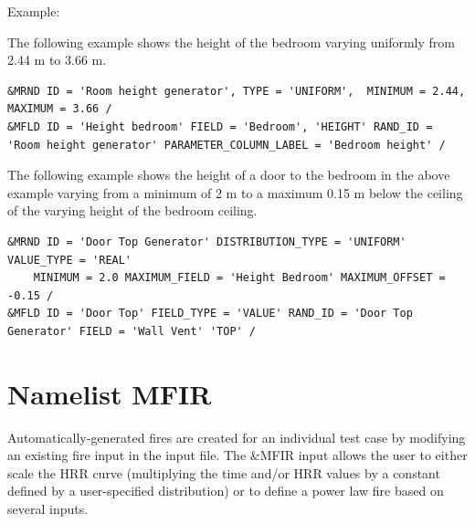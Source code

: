 \documentclass[12pt,twoside]{book}
\begin{document}
\vspace{\baselineskip}
\noindent Example:

The following example shows the height of the bedroom varying uniformly from 2.44 m to 3.66 m.
\begin{lstlisting}
&MRND ID = 'Room height generator', TYPE = 'UNIFORM',  MINIMUM = 2.44, MAXIMUM = 3.66 /
&MFLD ID = 'Height bedroom' FIELD = 'Bedroom', 'HEIGHT' RAND_ID = 'Room height generator' PARAMETER_COLUMN_LABEL = 'Bedroom height' /
\end{lstlisting}

The following example shows the height of a door to the bedroom in the above example varying from a minimum of 2 m to a maximum 0.15 m below the ceiling of the varying height of the bedroom ceiling.

\begin{lstlisting}
&MRND ID = 'Door Top Generator' DISTRIBUTION_TYPE = 'UNIFORM' VALUE_TYPE = 'REAL'
    MINIMUM = 2.0 MAXIMUM_FIELD = 'Height Bedroom' MAXIMUM_OFFSET = -0.15 /
&MFLD ID = 'Door Top' FIELD_TYPE = 'VALUE' RAND_ID = 'Door Top Generator' FIELD = 'Wall Vent' 'TOP' /
\end{lstlisting}


\clearpage

\section{Namelist MFIR}
\label{info:MFIR}

Automatically-generated fires are created for an individual test case by modifying an existing fire input in the input file. The {\ct \&MFIR} input allows the user to either scale the HRR curve (multiplying the time and/or HRR values by a constant defined by a user-specified distribution) or to define a power law fire based on several inputs.
\end{document}
